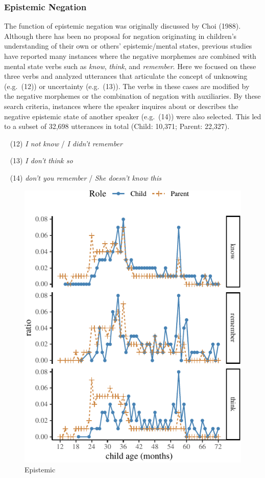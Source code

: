 \documentclass[
  english,
  man,floatsintext]{apa6}
\begin{document}
\hypertarget{epistemic-negation}{%
\subsubsection{Epistemic Negation}\label{epistemic-negation}}

The function of epistemic negation was originally discussed by Choi (1988). Although there has been no proposal for negation originating in children's understanding of their own or others' epistemic/mental states, previous studies have reported many instances where the negative morphemes are combined with mental state verbs such as \emph{know}, \emph{think}, and \emph{remember}. Here we focused on these three verbs and analyzed utterances that articulate the concept of unknowing (e.g.~(12)) or uncertainty (e.g.~(13)). The verbs in these cases are modified by the negative morphemes or the combination of negation with auxiliaries. By these search criteria, instances where the speaker inquires about or describes the negative epistemic state of another speaker (e.g.~(14)) were also selected. This led to a subset of 32,698 utterances in total (Child: 10,371; Parent: 22,327).

~
(12) \emph{I not know} / \emph{I didn't remember}

~
(13) \emph{I don't think so}

~
(14) \emph{don't you remember} / \emph{She doesn't know this}

\begin{figure}[H]

{\centering \includegraphics{neg_combos_full_files/figure-latex/epistemic-1} 

}

\caption{Epistemic}\label{fig:epistemic}
\end{figure}
\end{document}
